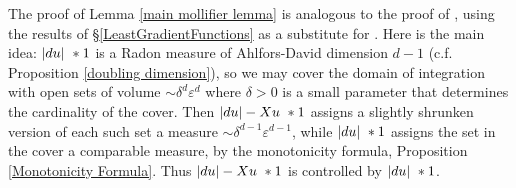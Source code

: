 The proof of Lemma \ref{main mollifier lemma} is analogous to the proof of \cite[Theorem 7.3]{Giusti77}, using the results of \S\ref{LeastGradientFunctions} as a substitute for \cite[Chapter 5]{Giusti77}.
Here is the main idea: $|du| ~*1$ is a Radon measure of Ahlfors-David dimension $d - 1$ (c.f. Proposition \ref{doubling dimension}), so we may cover the domain of integration with open sets of volume $\sim \delta^d\varepsilon^d$ where $\delta > 0$ is a small parameter that determines the cardinality of the cover.
Then $|du| - Xu ~*1$ assigns a slightly shrunken version of each such set a measure $\sim \delta^{d - 1} \varepsilon^{d - 1}$, while $|du|~*1$ assigns the set in the cover a comparable measure, by the monotonicity formula, Proposition \ref{Monotonicity Formula}.
Thus $|du| - Xu ~*1$ is controlled by $|du|~*1$.

